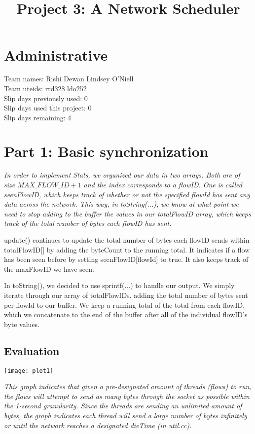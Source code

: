 \documentclass[11pt, letterpaper]{article}
\title{Project 3: A Network Scheduler}
\begin{document}
\maketitle
\section{Administrative}

Team names: Rishi Dewan Lindsey O'Niell\\
Team uteids: rrd328 ldo252\\
Slip days previously used: 0\\
Slip days used this project: 0\\
Slip days remaining: 4\\

\section{Part 1: Basic synchronization}

{\em 
In order to implement Stats, we organized our data in two arrays. Both are of size $MAX\_FLOW\_ID + 1$ and the 
index corresponds to a flowID. 
One is called seenFlowID, which keeps track of whether or not the specified flowId has sent any data across 
the network. This way, in toString(...), we know at what point we need to 
stop adding to the buffer the values in our totalFlowID array, which keeps track of the total number 
of bytes each flowID has sent. 

update() continues to update the total number of bytes each flowID sends within
totalFlowID[] by adding the byteCount to the running total.  
It indicates if a flow has been seen before by setting seenFlowID[flowId]
to true. It also keeps track of the maxFlowID we have seen. 

In toString(), we decided to use sprintf(...) to handle our output. We simply iterate through our array of 
totalFlowIDs, adding the total number of bytes sent per flowId to our buffer. We keep a running total of the total from 
each flowID, which we concatenate to the end of the buffer after all of the individual flowID's byte values. 
}

\subsection{Evaluation}

\centerline{\texttt{[image: plot1]}}

{\em This graph indicates that given a pre-designated amount of threads (flows) to run, the
flows will attempt to send as many bytes through the socket as possible within the 1-second granularity.
Since the threads are sending an unlimited amount of bytes, the graph indicates each thread will send
a large number of bytes infinitely or until the network reaches a designated dieTime (in util.cc).}
\end{document}
